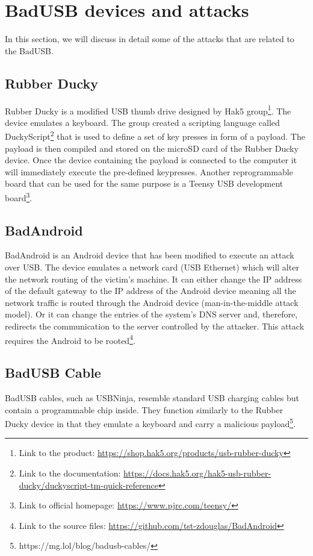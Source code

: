 \section{BadUSB devices and attacks}
\label{sec:badusb_devices}
In this section, we will discuss in detail some of the attacks that are related to the BadUSB.

\subsection*{Rubber Ducky}
Rubber Ducky is a modified USB thumb drive designed by Hak5 group\footnote{Link to the product: \url{https://shop.hak5.org/products/usb-rubber-ducky}}. The device emulates a keyboard. The group created a scripting language called DuckyScript\footnote{Link to the documentation: \url{https://docs.hak5.org/hak5-usb-rubber-ducky/duckyscript-tm-quick-reference}} that is used to define a set of key presses in form of a payload. The payload is then compiled and stored on the microSD card of the Rubber Ducky device. Once the device containing the payload is connected to the computer it will immediately execute the pre-defined keypresses. Another reprogrammable board that can be used for the same purpose is a Teensy USB development board\footnote{Link to official homepage: \url{https://www.pjrc.com/teensy/}}.

\subsection*{BadAndroid}
BadAndroid is an Android device that has been modified to execute an attack over USB. The device emulates a network card (USB Ethernet) which will alter the network routing of the victim's machine. It can either change the IP address of the default gateway to the IP address of the Android device meaning all the network traffic is routed through the Android device (man-in-the-middle attack model). Or it can change the entries of the system's DNS server and, therefore, redirects the communication to the server controlled by the attacker. This attack requires the Android to be rooted\footnote{Link to the source files: \url{https://github.com/tst-zdouglas/BadAndroid}}.

\subsection*{BadUSB Cable}
BadUSB cables, such as USBNinja, resemble standard USB charging cables but contain a programmable chip inside. They function similarly to the Rubber Ducky device in that they emulate a keyboard and carry a malicious payload\footnote{https://mg.lol/blog/badusb-cables/}.

